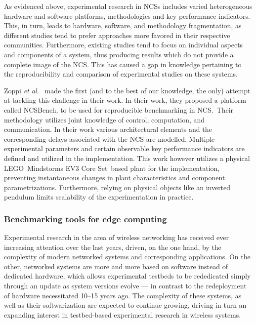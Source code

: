 As evidenced above, experimental research in \glspl{NCS} includes varied heterogeneous hardware and software platforms, methodologies and key performance indicators.
This, in turn, leads to hardware, software, and methodology fragmentation, as different studies tend to prefer approaches more favored in their respective communities.
Furthermore, existing studies tend to focus on individual aspects and components of a system, thus producing results which do not provide a complete image of the \gls{NCS}.
This has caused a gap in knowledge pertaining to the reproducibility and comparison of experimental studies on these systems.

Zoppi \emph{et al.}~\cite{Zoppi2020NCSBench} made the first (and to the best of our knowledge, the only) attempt at tackling this challenge in their work.
In their work, they proposed a platform called NCSBench, to be used for reproducible benchmarking in NCS.\
Their methodology utilizes joint knowledge of control, computation, and communication.
In their work various architectural elements and the corresponding delays associated with the NCS are modelled.
Multiple experimental parameters and certain observable key performance indicators are defined and utilized in the implementation.
This work however utilizes a physical LEGO\textregistered{}\ Mindstorms EV3 Core Set\texttrademark{}\  based plant for the implementation, preventing instantaneous changes in plant characteristics and component parametrizations.
Furthermore, relying on physical objects like an inverted pendulum limits scalability of the experimentation in practice.

\subsubsection{Benchmarking tools for edge computing}

Experimental research in the area of wireless networking has received ever increasing attention over the last years, driven, on the one hand, by the complexity of modern networked systems and corresponding applications.
On the other, networked systems are more and more based on software instead of dedicated hardware, which allows experimental testbeds to be rededicated simply through an update as system versions evolve --- in contrast to the redeployment of hardware necessitated \numrange[range-phrase={--}]{10}{15} years ago.
The complexity of these systems, as well as their softwarization are expected to continue growing, driving in turn an expanding interest in testbed-based experimental research in wireless systems.

